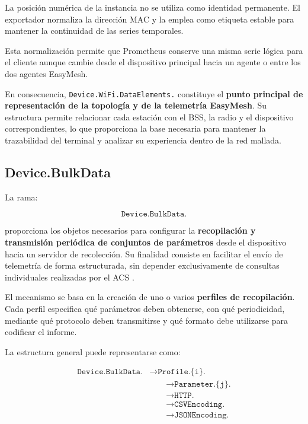 La posición numérica de la instancia no se utiliza como identidad
permanente. El exportador normaliza la dirección MAC y la emplea como
etiqueta estable para mantener la continuidad de las series temporales.

Esta normalización permite que Prometheus conserve una misma serie lógica
para el cliente aunque cambie desde el dispositivo principal hacia un
agente o entre los dos agentes EasyMesh.

En consecuencia, \texttt{Device.WiFi.DataElements.} constituye el
\textbf{punto principal de representación de la topología y de la
telemetría EasyMesh}. Su estructura permite relacionar cada estación con
el BSS, la radio y el dispositivo correspondientes, lo que proporciona la
base necesaria para mantener la trazabilidad del terminal y analizar su
experiencia dentro de la red mallada.

\subsection{Device.BulkData}
\label{subsec:device-bulkdata}

La rama:

\[
    \texttt{Device.BulkData.}
\]

proporciona los objetos necesarios para configurar la
\textbf{recopilación y transmisión periódica de conjuntos de parámetros}
desde el dispositivo hacia un servidor de recolección. Su finalidad
consiste en facilitar el envío de telemetría de forma estructurada, sin
depender exclusivamente de consultas individuales realizadas por el ACS
\cite{bbf_tr181}.

El mecanismo se basa en la creación de uno o varios
\textbf{perfiles de recopilación}. Cada perfil especifica qué parámetros
deben obtenerse, con qué periodicidad, mediante qué protocolo deben
transmitirse y qué formato debe utilizarse para codificar el informe.

La estructura general puede representarse como:

\[
\begin{aligned}
    \texttt{Device.BulkData.}
    &\longrightarrow \texttt{Profile.\{i\}.}\\
    &\qquad\longrightarrow \texttt{Parameter.\{j\}.}\\
    &\qquad\longrightarrow \texttt{HTTP.}\\
    &\qquad\longrightarrow \texttt{CSVEncoding.}\\
    &\qquad\longrightarrow \texttt{JSONEncoding.}
\end{aligned}
\]

